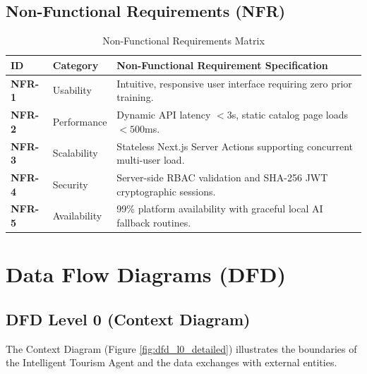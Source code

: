 \documentclass[12pt,a4paper]{report}
\begin{document}
\subsection{Non-Functional Requirements (NFR)}
\begin{table}[htbp]
\centering
\small
\caption{Non-Functional Requirements Matrix}
\label{tab:nfr_complete}
\begin{tabularx}{\textwidth}{l l X}
\toprule
\textbf{ID} & \textbf{Category} & \textbf{Non-Functional Requirement Specification} \\
\midrule
\textbf{NFR-1} & Usability & Intuitive, responsive user interface requiring zero prior training. \\
\textbf{NFR-2} & Performance & Dynamic API latency $<3$s, static catalog page loads $<500$ms. \\
\textbf{NFR-3} & Scalability & Stateless Next.js Server Actions supporting concurrent multi-user load. \\
\textbf{NFR-4} & Security & Server-side RBAC validation and SHA-256 JWT cryptographic sessions. \\
\textbf{NFR-5} & Availability & 99\% platform availability with graceful local AI fallback routines. \\
\bottomrule
\end{tabularx}
\end{table}

\section{Data Flow Diagrams (DFD)}

\subsection{DFD Level 0 (Context Diagram)}
The Context Diagram (Figure \ref{fig:dfd_l0_detailed}) illustrates the boundaries of the Intelligent Tourism Agent and the data exchanges with external entities.
\end{document}

